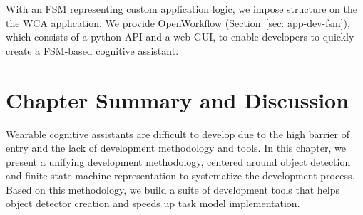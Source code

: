 With an FSM representing custom application logic, we impose structure on the
the WCA application. We provide OpenWorkflow (Section~\ref{sec: app-dev-fsm}),
which consists of a python API and a web GUI, to enable developers to quickly
create a FSM-based cognitive assistant. 




\section{Chapter Summary and Discussion}

Wearable cognitive assistants are difficult to develop due to the high barrier of
entry and the lack of development methodology and tools. In this chapter, we
present a unifying development methodology, centered around object detection and
finite state machine representation to systematize the development process.
Based on this methodology, we build a suite of development tools that helps
object detector creation and speeds up task model implementation. 

